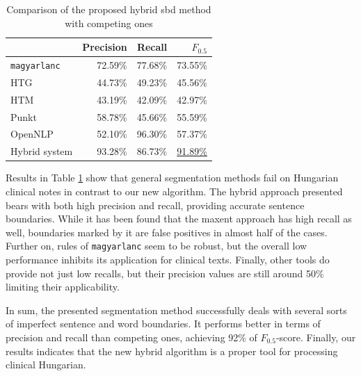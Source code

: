 \begin{table}[H]
\centering
\caption{Comparison of the proposed hybrid \acrshort{sbd} method with competing ones}
\label{tab:comparison}
\begin{tabular}{ l r r r} 
\hline
& Precision & Recall & $F_{0.5}$ \\
\hline
\texttt{magyarlanc} & 72.59\% & 77.68\% & 73.55\% \\
HTG & 44.73\% & 49.23\% & 45.56\% \\
HTM & 43.19\% & 42.09\% & 42.97\% \\
Punkt & 58.78\% & 45.66\% & 55.59\%  \\
OpenNLP & 52.10\% & 96.30\% & 57.37\% \\
Hybrid system & 93.28\% & 86.73\% & \underline{91.89\%} \\
\hline
\end{tabular}
\end{table}

Results in Table \ref{tab:comparison} show that general segmentation methods fail on Hungarian clinical notes in contrast to our new algorithm. 
The hybrid approach presented bears with both high precision and recall, providing accurate sentence boundaries.
While it has been found that the \acrshort{maxent} approach has high recall as well, boundaries marked by it are false positives in almost half of the cases. 
Further on, rules of \texttt{magyarlanc} seem to be robust, but the overall low performance inhibits its application for clinical texts. 
Finally, other tools do provide not just low recalls, but their precision values are still around 50\% limiting their applicability. 

In sum, the presented segmentation method successfully deals with several sorts of imperfect sentence and word boundaries.
It performs better in terms of precision and recall than competing ones, achieving 92\% of $F_{0.5}$-score. 
Finally, our results indicates that the new hybrid algorithm is a proper tool for processing clinical Hungarian.


